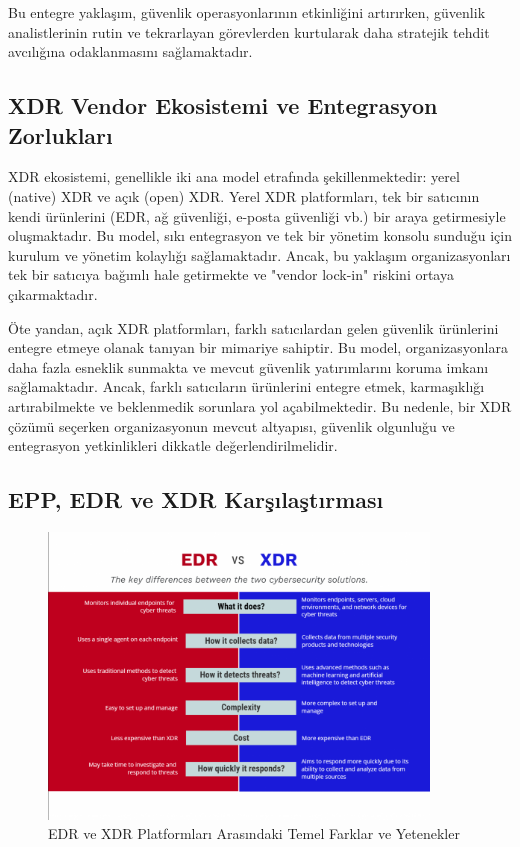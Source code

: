 Bu entegre yaklaşım, güvenlik operasyonlarının etkinliğini artırırken, güvenlik analistlerinin rutin ve tekrarlayan görevlerden kurtularak daha stratejik tehdit avcılığına odaklanmasını sağlamaktadır.

\subsection{XDR Vendor Ekosistemi ve Entegrasyon Zorlukları}

XDR ekosistemi, genellikle iki ana model etrafında şekillenmektedir: yerel (native) XDR ve açık (open) XDR. Yerel XDR platformları, tek bir satıcının kendi ürünlerini (EDR, ağ güvenliği, e-posta güvenliği vb.) bir araya getirmesiyle oluşmaktadır. Bu model, sıkı entegrasyon ve tek bir yönetim konsolu sunduğu için kurulum ve yönetim kolaylığı sağlamaktadır. Ancak, bu yaklaşım organizasyonları tek bir satıcıya bağımlı hale getirmekte ve "vendor lock-in" riskini ortaya çıkarmaktadır.

Öte yandan, açık XDR platformları, farklı satıcılardan gelen güvenlik ürünlerini entegre etmeye olanak tanıyan bir mimariye sahiptir. Bu model, organizasyonlara daha fazla esneklik sunmakta ve mevcut güvenlik yatırımlarını koruma imkanı sağlamaktadır. Ancak, farklı satıcıların ürünlerini entegre etmek, karmaşıklığı artırabilmekte ve beklenmedik sorunlara yol açabilmektedir. Bu nedenle, bir XDR çözümü seçerken organizasyonun mevcut altyapısı, güvenlik olgunluğu ve entegrasyon yetkinlikleri dikkatle değerlendirilmelidir.

\subsection{EPP, EDR ve XDR Karşılaştırması}

\begin{figure}[H]
    \centering
    \includegraphics[width=0.9\textwidth]{img/edr-xdr-comparison.png}
    \caption{EDR ve XDR Platformları Arasındaki Temel Farklar ve Yetenekler}
    \label{fig:edr-xdr-comparison}
\end{figure}


